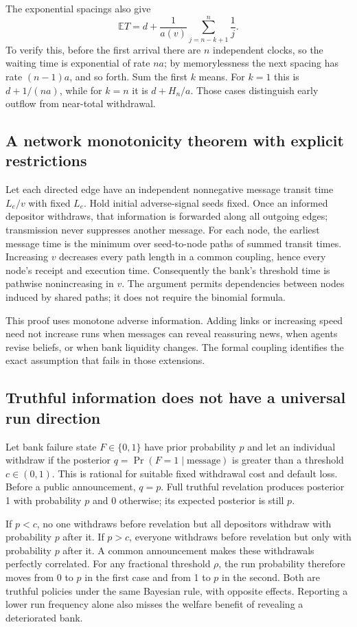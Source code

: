 \documentclass[11pt]{article}
\newcommand{\E}{\mathbb E}
\begin{document}
The exponential spacings also give
\[
 \E T=d+\frac1{a(v)}\sum_{j=n-k+1}^{n}\frac1j.
\]
To verify this, before the first arrival there are $n$ independent clocks,
so the waiting time is exponential of rate $na$; by memorylessness the
next spacing has rate $(n-1)a$, and so forth. Sum the first $k$ means.
For $k=1$ this is $d+1/(na)$, while for $k=n$ it is $d+H_n/a$.
Those cases distinguish early outflow from near-total withdrawal.

\subsection*{A network monotonicity theorem with explicit restrictions}
Let each directed edge have an independent nonnegative message transit
time $L_e/v$ with fixed $L_e$. Hold initial adverse-signal seeds fixed.
Once an informed depositor withdraws, that information is forwarded along
all outgoing edges; transmission never suppresses another message.
For each node, the earliest message time is the minimum over seed-to-node
paths of summed transit times. Increasing $v$ decreases every path length
in a common coupling, hence every node's receipt and execution time.
Consequently the bank's threshold time is pathwise nonincreasing in $v$.
The argument permits dependencies between nodes induced by shared paths;
it does not require the binomial formula.

This proof uses monotone adverse information. Adding links or increasing
speed need not increase runs when messages can reveal reassuring news,
when agents revise beliefs, or when bank liquidity changes. The formal
coupling identifies the exact assumption that fails in those extensions.

\subsection*{Truthful information does not have a universal run direction}
Let bank failure state $F\in\{0,1\}$ have prior probability $p$ and let
an individual withdraw if the posterior $q=\Pr(F=1\mid\text{message})$
is greater than a threshold $c\in(0,1)$. This is rational for suitable
fixed withdrawal cost and default loss. Before a public announcement,
$q=p$. Full truthful revelation produces posterior 1 with probability
$p$ and 0 otherwise; its expected posterior is still $p$.

If $p<c$, no one withdraws before revelation but all depositors withdraw
with probability $p$ after it. If $p>c$, everyone withdraws before revelation
but only with probability $p$ after it. A common announcement makes these
withdrawals perfectly correlated. For any fractional threshold $\rho$,
the run probability therefore moves from 0 to $p$ in the first case and
from 1 to $p$ in the second. Both are truthful policies under the same
Bayesian rule, with opposite effects. Reporting a lower run frequency alone
also misses the welfare benefit of revealing a deteriorated bank.
\end{document}
